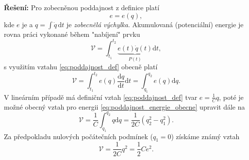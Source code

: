 \documentclass[twoside]{article}
\begin{document}
\textbf{Řešení:} 
Pro zobecněnou poddajnost z definice platí 
\begin{equation}
	e = e(q),
	\label{eq:poddajnost_def}
\end{equation}
kde $e$ je  a $q = \int \dot{q}\,\text{d}t$ je \textit{zobecnělá výchylka}.
Akumulovaná (potenciální) energie je rovna práci vykonané během "nabíjení" prvku
\begin{equation}
	\mathcal{V} = \int_{t_1}^{t_2} \underbrace{e(t) \dot{q}(t)}_{P(t)} \text{d}t,
	\label{eq:poddajnosT_obecne}
\end{equation}
s využitím vztahu \eqref{eq:poddajnost_def} obecně platí
\begin{equation}
	\mathcal{V} = \int_{t_1}^{t_2} e(q) \frac{\text{d}q}{\text{d}t} \text{d}t = \int_{q_1}^{q_2} e(q) \text{d}q.
	\label{eq:poddajnost_energie_obecne}
\end{equation}
V lineárním případě má definiční vztah \eqref{eq:poddajnost_def} tvar $e = \frac{1}{C} q$,
poté je možné obecný vztah pro energii \eqref{eq:poddajnost_energie_obecne} upravit dále na
\begin{equation}
	\mathcal{V} = \frac{1}{C} \int_{q_1}^{q_2} q \text{d}q = \frac{1}{2C} (q_2^2 - q_1^2).
\end{equation}
Za předpokladu nulových počátečních podmínek ($q_1 = 0$) získáme známý vztah
\begin{equation}
	\mathcal{V} = \frac{1}{2C}q^2 = \frac{1}{2} C e^2.
\end{equation}
\end{document}
